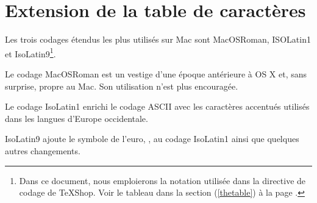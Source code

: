 \documentclass[11pt,french]{article}
\newcommand{\TS}{\textsf{\TeX Shop}}
\newcommand{\acr}[1]{\textsf{#1}}
\begin{document}
\section{Extension de la table de caractères}


Les trois codages étendus les plus utilisés sur Mac sont \acr{MacOSRoman}, \acr{ISOLatin1} et \acr{IsoLatin9}\footnote{Dans ce document, nous emploierons la notation utilisée dans la directive de codage de \TS. Voir le tableau dans la section (\ref{thetable}) à la page \pageref{thetable}.}.

Le codage \acr{MacOSRoman} est un vestige d'une époque antérieure à \acr{OS X} et, sans surprise, propre au Mac. Son utilisation n'est plus encouragée.

Le codage \acr{IsoLatin1} enrichi le codage \acr{ASCII} avec les caractères accentués utilisés dans les langues d'Europe occidentale.

\acr{IsoLatin9} ajoute le symbole de l'euro, \eurologo, au codage \acr{IsoLatin1} ainsi que quelques autres changements.
\end{document}
